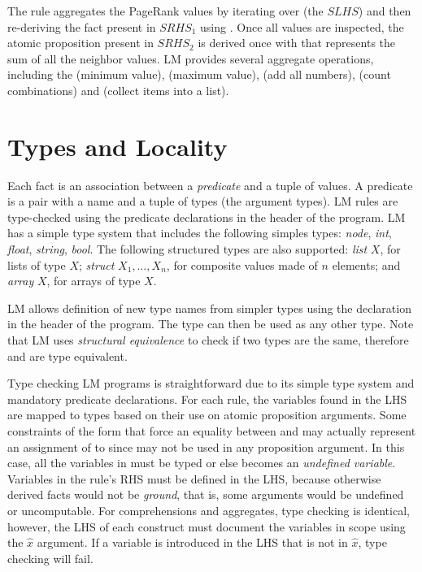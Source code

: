 The rule aggregates the PageRank values  by iterating over
 (the $SLHS$) and then re-deriving the
fact present in $SRHS_1$ using . Once all
values are inspected, the atomic proposition  present in
$SRHS_2$ is derived once with  that represents the sum of all the
neighbor values. LM provides several aggregate operations, including the
 (minimum value),  (maximum value),  (add all
numbers),  (count combinations) and  (collect items
into a list).

\section{Types and Locality}

Each fact is an association between a \emph{predicate} and a tuple of values. A
predicate is a pair with a name and a tuple of types (the argument types). LM
rules are type-checked using the predicate declarations in the header of the
program. LM has a simple type system that includes the following simples types:
\emph{node}, \emph{int}, \emph{float}, \emph{string}, \emph{bool}. The following
structured types are also supported: \emph{list} $X$, for lists of type $X$;
\emph{struct} $X_1, \ldots, X_n$, for composite values made of $n$ elements; and
\emph{array} $X$, for arrays of type $X$.

LM allows definition of new type names from simpler types using the declaration
 in the header of the program. The type
 can then be used as any other type. Note that LM uses
\emph{structural equivalence} to check if two types are the same, therefore
 and  are type equivalent.

Type checking LM programs is straightforward due to its simple type system and
mandatory predicate declarations. For each rule, the variables found in the LHS
are mapped to types based on their use on atomic proposition arguments. Some
constraints of the form  that force an equality between
 and  may actually represent an assignment of
 to  since  may not be used in any proposition
argument. In this case, all the variables in  must be typed or
else  becomes an \emph{undefined variable}. Variables in the rule's RHS
must be defined in the LHS, because otherwise derived facts would not be
\emph{ground}, that is, some arguments would be undefined or uncomputable.  For
comprehensions and aggregates, type checking is identical, however, the LHS of
each construct must document the variables in scope using the $\hat{x}$
argument. If a variable is introduced in the LHS that is not in $\hat{x}$, type
checking will fail.


